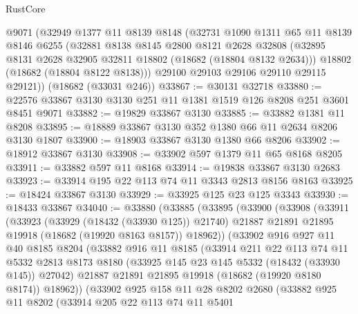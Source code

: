 \begin{lexlean}{RustCore}
\begin{coremodule}
    @9071
    (@32949
      @1377
      @11
      @8139
      @8148
      (@32731
        @1090
        @1311
        @65
        @11
        @8139
        @8146
        @6255
        (@32881
          @8138
          @8145
          @2800
          @8121
          @2628
          @32808
          (@32895 @8131 @2628 @32905 @32811 @18802 (@18682 (@18804 @8132 @2634)))
          @18802
          (@18682 (@18804 @8122 @8138)))
        @29100
        @29103
        @29106
        @29110
        @29115
        @29121))
    (@18682 (@33031 @246))
@33867 := @30131 @32718
@33880 := @22576 @33867 @3130 @3130 @251 @11 @1381 @1519 @126 @8208 @251 @3601 @8451 @9071
@33882 := @19829 @33867 @3130
@33885 := @33882 @1381 @11 @8208
@33895 := @18889 @33867 @3130 @352 @1380 @66 @11 @2634 @8206 @3130 @1807
@33900 := @18903 @33867 @3130 @1380 @66 @8206
@33902 := @18912 @33867 @3130
@33908 := @33902 @597 @1379 @11 @65 @8168 @8205
@33911 := @33882 @597 @11 @8168
@33914 := @19838 @33867 @3130 @2683
@33923 := @33914 @195 @22 @113 @74 @11 @3343 @2813 @8156 @8163
@33925 := @18424 @33867 @3130
@33929 := @33925 @125 @23 @125 @3343
@33930 := @18433 @33867
@34040 := @33880
    (@33885
      (@33895
        (@33900
          (@33908
            (@33911
              (@33923
                (@33929 (@18432 (@33930 @125)) @21740)
                @21887
                @21891
                @21895
                @19918
                (@18682 (@19920 @8163 @8157))
                @18962))
            (@33902
              @916
              @927
              @11
              @40
              @8185
              @8204
              (@33882
                @916
                @11
                @8185
                (@33914
                  @211
                  @22
                  @113
                  @74
                  @11
                  @5332
                  @2813
                  @8173
                  @8180
                  (@33925 @145 @23 @145 @5332 (@18432 (@33930 @145)) @27042)
                  @21887
                  @21891
                  @21895
                  @19918
                  (@18682 (@19920 @8180 @8174))
                  @18962))
              (@33902
                @925
                @158
                @11
                @28
                @8202
                @2680
                (@33882
                  @925
                  @11
                  @8202
                  (@33914
                    @205
                    @22
                    @113
                    @74
                    @11
                    @5401

\end{coremodule}
\end{lexlean}
